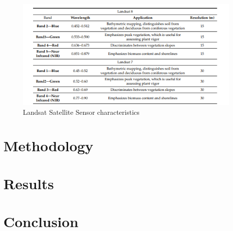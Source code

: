 \documentclass[12pt,a4paper,IEEEtran]{article}
\begin{document}
\begin{figure}[h]
	\centering
	\includegraphics[width=0.7\linewidth]{./wavelength-9.png}
	\caption{Landsat Satellite Sensor characteristics}
	\label{fig:wavelength}
\end{figure}

\section{Methodology}

\section{Results}

\section{Conclusion}



\end{document}
